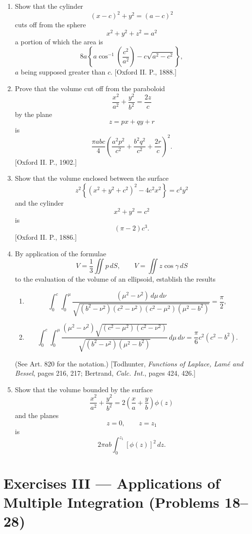 \documentclass[11pt, a4paper]{article}
\newcommand{\source}[1]{\hfill\textnormal{[#1]}}
\begin{document}
\begin{enumerate}[leftmargin=2em]
\item[13.] Show that the cylinder
\[
(x-c)^2+y^2=(a-c)^2
\]
cuts off from the sphere
\[
x^2+y^2+z^2=a^2
\]
a portion of which the area is
\[
8a\left\{a\cos^{-1}\left(\frac{c^2}{a^2}\right)-c\sqrt{a^2-c^2}\right\},
\]
$a$ being supposed greater than $c$.
\source{Oxford II. P., 1888.}

\item[14.] Prove that the volume cut off from the paraboloid
\[
\frac{x^2}{a^2}+\frac{y^2}{b^2}=\frac{2z}{c}
\]
by the plane
\[
z=px+qy+r
\]
is
\[
\frac{\pi abc}{4}
\left(
\frac{a^2p^2}{c^2}
+\frac{b^2q^2}{c^2}
+\frac{2r}{c}
\right)^2.
\]
\source{Oxford II. P., 1902.}

\item[15.] Show that the volume enclosed between the surface
\[
z^2\left\{(x^2+y^2+c^2)^2-4c^2x^2\right\}=c^4y^2
\]
and the cylinder
\[
x^2+y^2=c^2
\]
is
\[
(\pi-2)c^3.
\]
\source{Oxford II. P., 1886.}

\item[16.] By application of the formulae
\[
V=\frac13\iint p\,dS,\qquad V=\iint z\cos\gamma\,dS
\]
to the evaluation of the volume of an ellipsoid, establish the results
\begin{enumerate}[label=(\arabic*)]
\item
\[
\int_0^c\int_0^\mu
\frac{(\mu^2-\nu^2)\,d\mu\,d\nu}
{\sqrt{(b^2-\nu^2)(c^2-\nu^2)(c^2-\mu^2)(\mu^2-b^2)}}
=\frac{\pi}{2},
\]
\item
\[
\int_0^c\int_0^\mu
\frac{(\mu^2-\nu^2)\sqrt{(c^2-\mu^2)(c^2-\nu^2)}}
{\sqrt{(b^2-\nu^2)(\mu^2-b^2)}}\,d\mu\,d\nu
=
\frac{\pi}{6}c^2(c^2-b^2).
\]
\end{enumerate}
(See Art. 820 for the notation.)
\source{Todhunter, \textit{Functions of Laplace, Lamé and Bessel}, pages 216, 217; Bertrand, \textit{Calc. Int.}, pages 424, 426.}

\item[17.] Show that the volume bounded by the surface
\[
\frac{x^2}{a^2}+\frac{y^2}{b^2}
=
2\left(\frac{x}{a}+\frac{y}{b}\right)\phi(z)
\]
and the planes
\[
z=0,\qquad z=z_1
\]
is
\[
2\pi ab\int_0^{z_1}[\phi(z)]^2\,dz.
\]

\end{enumerate}

\section*{Exercises III --- Applications of Multiple Integration (Problems 18--28)}
\end{document}
